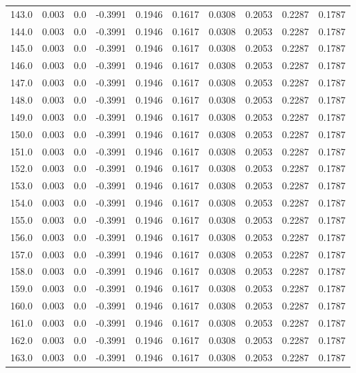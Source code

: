 \begin{longtable}{lrrrrrrrrr}
143.0 & 0.003 & 0.0 & -0.3991 & 0.1946 & 0.1617 & 0.0308 & 0.2053 & 0.2287 & 0.1787 \\
144.0 & 0.003 & 0.0 & -0.3991 & 0.1946 & 0.1617 & 0.0308 & 0.2053 & 0.2287 & 0.1787 \\
145.0 & 0.003 & 0.0 & -0.3991 & 0.1946 & 0.1617 & 0.0308 & 0.2053 & 0.2287 & 0.1787 \\
146.0 & 0.003 & 0.0 & -0.3991 & 0.1946 & 0.1617 & 0.0308 & 0.2053 & 0.2287 & 0.1787 \\
147.0 & 0.003 & 0.0 & -0.3991 & 0.1946 & 0.1617 & 0.0308 & 0.2053 & 0.2287 & 0.1787 \\
148.0 & 0.003 & 0.0 & -0.3991 & 0.1946 & 0.1617 & 0.0308 & 0.2053 & 0.2287 & 0.1787 \\
149.0 & 0.003 & 0.0 & -0.3991 & 0.1946 & 0.1617 & 0.0308 & 0.2053 & 0.2287 & 0.1787 \\
150.0 & 0.003 & 0.0 & -0.3991 & 0.1946 & 0.1617 & 0.0308 & 0.2053 & 0.2287 & 0.1787 \\
151.0 & 0.003 & 0.0 & -0.3991 & 0.1946 & 0.1617 & 0.0308 & 0.2053 & 0.2287 & 0.1787 \\
152.0 & 0.003 & 0.0 & -0.3991 & 0.1946 & 0.1617 & 0.0308 & 0.2053 & 0.2287 & 0.1787 \\
153.0 & 0.003 & 0.0 & -0.3991 & 0.1946 & 0.1617 & 0.0308 & 0.2053 & 0.2287 & 0.1787 \\
154.0 & 0.003 & 0.0 & -0.3991 & 0.1946 & 0.1617 & 0.0308 & 0.2053 & 0.2287 & 0.1787 \\
155.0 & 0.003 & 0.0 & -0.3991 & 0.1946 & 0.1617 & 0.0308 & 0.2053 & 0.2287 & 0.1787 \\
156.0 & 0.003 & 0.0 & -0.3991 & 0.1946 & 0.1617 & 0.0308 & 0.2053 & 0.2287 & 0.1787 \\
157.0 & 0.003 & 0.0 & -0.3991 & 0.1946 & 0.1617 & 0.0308 & 0.2053 & 0.2287 & 0.1787 \\
158.0 & 0.003 & 0.0 & -0.3991 & 0.1946 & 0.1617 & 0.0308 & 0.2053 & 0.2287 & 0.1787 \\
159.0 & 0.003 & 0.0 & -0.3991 & 0.1946 & 0.1617 & 0.0308 & 0.2053 & 0.2287 & 0.1787 \\
160.0 & 0.003 & 0.0 & -0.3991 & 0.1946 & 0.1617 & 0.0308 & 0.2053 & 0.2287 & 0.1787 \\
161.0 & 0.003 & 0.0 & -0.3991 & 0.1946 & 0.1617 & 0.0308 & 0.2053 & 0.2287 & 0.1787 \\
162.0 & 0.003 & 0.0 & -0.3991 & 0.1946 & 0.1617 & 0.0308 & 0.2053 & 0.2287 & 0.1787 \\
163.0 & 0.003 & 0.0 & -0.3991 & 0.1946 & 0.1617 & 0.0308 & 0.2053 & 0.2287 & 0.1787 \\

\end{longtable}

